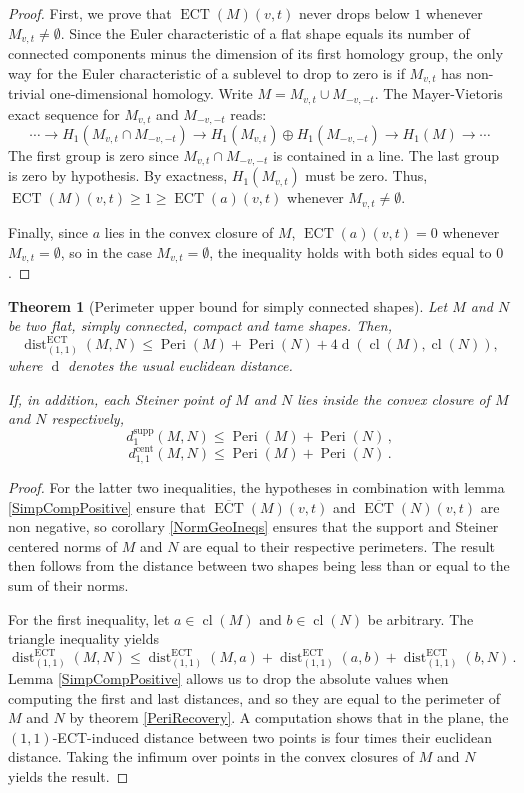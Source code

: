 \documentclass[a4paper]{article}
\newtheorem{theorem}{Theorem}[section]
\newcommand{\ECT}{\operatorname{ECT}}
\newcommand{\dd}{\operatorname{d}}
\newcommand{\dist}[2]{\operatorname{dist}^{\operatorname{ECT}}_{(#1, #2)}}
\newcommand{\Peri}{\operatorname{Peri}}
\newcommand{\dsupp}{d^{\operatorname{supp}}}
\newcommand{\dcent}{d^{\operatorname{cent}}}
\begin{document}
\begin{proof}
First, we prove that $\ECT(M)(v,t)$ never drops below $1$ whenever $M_{v, t}\neq \emptyset$. Since the Euler characteristic of a flat shape equals its number of connected components minus the dimension of its first homology group, the only way for the Euler characteristic of a sublevel to drop to zero is if $M_{v,t}$ has non-trivial one-dimensional homology. Write $M=M_{v,t} \cup M_{-v,-t}$. The Mayer-Vietoris exact sequence for $M_{v,t}$ and $M_{-v,-t}$ reads:
\[ \cdots \to H_1(M_{v,t} \cap M_{-v,-t})\to H_1(M_{v,t}) \oplus H_1(M_{-v,-t})\to H_1(M)\to \cdots \]
The first group is zero since $M_{v,t} \cap M_{-v,-t}$ is contained in a line. The last group is zero by hypothesis. By exactness, $H_1(M_{v,t})$ must be zero. Thus, $\ECT(M)(v,t)\geq 1\geq \ECT(a)(v,t)$ whenever $M_{v,t}\neq \emptyset$.

Finally, since $a$ lies in the convex closure of $M$, $\ECT(a)(v,t)=0$ whenever $M_{v,t}= \emptyset$, so in the case $M_{v,t}=\emptyset$, the inequality holds with both sides equal to $0$.
\end{proof}

\begin{theorem}[Perimeter upper bound for simply connected shapes]
	\label{PeriUpper}
	Let $M$ and $N$ be two flat, simply connected, compact and tame shapes. Then,
	\[ \dist{1}{1}(M,N)\leq \Peri(M)+ \Peri(N) +4 \dd(\operatorname{cl}(M), \operatorname{cl}(N)), \]
	where $\dd$ denotes the usual euclidean distance.
	
	If, in addition, each Steiner point of $M$ and $N$ lies inside the convex closure of $M$ and $N$ respectively,
	\[ \dsupp_1(M,N)\leq \Peri(M)+\Peri(N)\, , \]
	\[ \dcent_{1,1}(M,N) \leq \Peri(M)+\Peri(N) \, . \]
\end{theorem}

\begin{proof}
	For the latter two inequalities, the hypotheses in combination with lemma \ref{SimpCompPositive} ensure that $\overline{\ECT}(M)(v,t)$ and $\overline{\ECT}(N)(v,t)$ are non negative, so corollary \ref{NormGeoIneqs} ensures that the support and Steiner centered norms of $M$ and $N$ are equal to their respective perimeters. The result then follows from the distance between two shapes being less than or equal to the sum of their norms.
	
	For the first inequality, let $a \in \operatorname{cl}(M)$ and $b \in \operatorname{cl}(N)$ be arbitrary. The triangle inequality yields
	\[ \dist{1}{1}(M,N)\leq \dist{1}{1}(M,a)+\dist{1}{1}(a,b)+\dist{1}{1}(b,N)\, .\]
	Lemma \ref{SimpCompPositive} allows us to drop the absolute values when computing the first and last distances, and so they are equal to the perimeter of $M$ and $N$ by theorem \ref{PeriRecovery}. A computation shows that in the plane, the $(1,1)$-ECT-induced distance between two points is four times their euclidean distance. Taking the infimum over points in the convex closures of $M$ and $N$ yields the result.
\end{proof}
\end{document}
